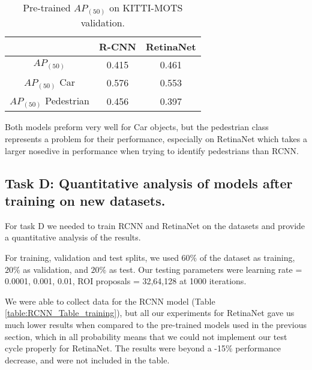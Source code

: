 \documentclass[12pt,a4paper,twocolumn,twoside]{article}
\begin{document}
\begin{table}[ht]
    \centering
    \begin{tabular}{|c || c | c|} 
        \hline
          & \textbf{R-CNN} & \textbf{RetinaNet} \\ [0.8ex] 
          \hline
         $AP_{(50)}$ & 0.415 & 0.461  \\ 
         \hline
         $AP_{(50)}$ Car & 0.576 & 0.553 \\
         \hline
         $AP_{(50)}$ Pedestrian & 0.456 & 0.397 \\
         \hline
    \end{tabular}
    \caption{\label{table:KITTI_Table1}Pre-trained $AP_{(50)}$ on KITTI-MOTS validation.}
\end{table}

Both models preform very well for Car objects, but the pedestrian class
represents a problem for their performance, especially on RetinaNet
which takes a larger nosedive in performance when trying to identify pedestrians
than RCNN.

\subsection{Task D: Quantitative analysis of models after training on new datasets.}

For task D we needed to train RCNN and RetinaNet on the datasets and provide
a quantitative analysis of the results. 

For training, validation and test splits, we used $60\%$ of the dataset as training, $20\%$
as validation, and $20\%$ as test. 
Our testing parameters were learning rate = {0.0001, 0.001, 0.01}, 
ROI proposals = {32,64,128} at 1000 iterations.

We were able to collect data for the RCNN model 
(Table \ref{table:RCNN_Table_training}), but 
all our experiments for RetinaNet gave us much lower results when compared to the pre-trained
models used in the previous section, which in all probability means that we could not
implement our test cycle properly for RetinaNet. The results were beyond a -15\% performance
decrease, and were not included in the table. 
\end{document}
